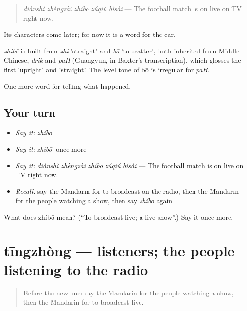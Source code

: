 \begin{quote}
\emph{diànshì zhèngzài zhíbō zúqiú bǐsài} — The football match is on live on TV right now.
\end{quote}

Its characters come later; for now it is a word for the ear.

\begin{cousinweb}
\emph{zhíbō} is built from \emph{zhí} 'straight' and \emph{bō} 'to scatter', both inherited from Middle Chinese, \emph{drik} and \emph{paH} (Guangyun, in Baxter's transcription), which glosses the first 'upright' and 'straight'. The level tone of bō is irregular for \emph{paH}.
\end{cousinweb}

\begin{grammarlens}[title={What you've built}]
One more word for telling what happened.
\end{grammarlens}

\subsection*{Your turn}
\begin{itemize}
\raggedright
  \item \emph{Say it:} \emph{zhíbō}
  \item \emph{Say it:} \emph{zhíbō}, once more
  \item \emph{Say it:} \emph{diànshì zhèngzài zhíbō zúqiú bǐsài} — The football match is on live on TV right now.
  \item \emph{Recall:} say the Mandarin for to broadcast on the radio, then the Mandarin for the people watching a show, then say \emph{zhíbō} again
\end{itemize}

\begin{tcolorbox}[breakable,colback=teal!4,colframe=teal!35!black,title={Before you move on}]
What does zhíbō mean? (\textquotedblleft{}To broadcast live; a live show\textquotedblright{}.) Say it once more.
\end{tcolorbox}
\section[tīngzhòng]{tīngzhòng — listeners; the people listening to the radio}

\label{lesson:ZH-C292-tingzhong}



\begin{quote}
Before the new one: say the Mandarin for the people watching a show, then the Mandarin for to broadcast live.
\end{quote}

